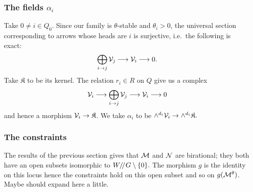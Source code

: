 \documentclass{amsart}
\theoremstyle{definition}
\begin{document}


\subsubsection{The fields $\alpha_i$}


Take $0 \neq i \in Q_0$.
Since our family is $\theta$-stable and $\theta_i>0$, the universal section corresponding to arrows whose heads are $i$ is surjective, i.e.\ the following is exact:
\begin{equation}\label{eq:k}
    \bigoplus_{i \rightarrow j} \mathcal{V}_j \longrightarrow \mathcal{V}_i \longrightarrow 0.
\end{equation}
Take $\mathfrak{K}$ to be its kernel.
The relation $r_i \in R$ on $Q$ give us a complex
$$\mathcal{V}_i \longrightarrow \bigoplus_{i \rightarrow j} \mathcal{V}_j \longrightarrow \mathcal{V}_i \longrightarrow 0$$
and hence a morphism $\mathcal{V}_i \rightarrow \mathfrak{K}$.
We take $\alpha_i$ to be $\wedge^{d_i} \mathcal{V}_i \rightarrow \wedge^{d_i}\mathfrak{K}.$


\subsubsection{The constraints}
The results of the previous section gives that $\mathcal{M}$ and $\mathcal{N}$ are birational; they both have an open subsets isomorphic to $W/ \! /_{} G \setminus \{0\}.$
The morphism $g$ is the identity on this locus hence the constraints hold on this open subset and so on $g(\mathcal{M}^\theta)$.
{\red Maybe should expand here a little.}
\end{document}
